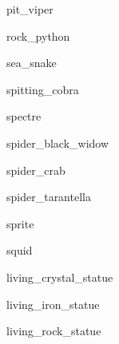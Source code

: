\documentclass[letterpaper,serif]{module}
\begin{document}
\begin{newmonster}{pit_viper}\end{newmonster}

\begin{newmonster}{rock_python}\end{newmonster}

\begin{newmonster}{sea_snake}\end{newmonster}

\begin{newmonster}{spitting_cobra}\end{newmonster}

\begin{newmonster}{spectre}\end{newmonster}

\begin{newmonster}{spider_black_widow}\end{newmonster}

\begin{newmonster}{spider_crab}\end{newmonster}

\begin{newmonster}{spider_tarantella}\end{newmonster}

\begin{newmonster}{sprite}\end{newmonster}

\begin{newmonster}{squid}\end{newmonster}

\begin{newmonster}{living_crystal_statue}\end{newmonster}

\begin{newmonster}{living_iron_statue}\end{newmonster}

\begin{newmonster}{living_rock_statue}\end{newmonster}
\end{document}

